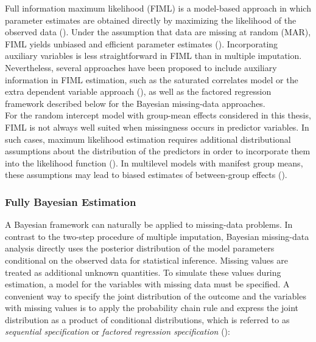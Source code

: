 \documentclass[
  letterpaper,
  11pt,
  english,
  singlespacing,
  headsepline,
  openany]{MastersDoctoralThesis}
\begin{document}
Full information maximum likelihood (FIML) is a model-based approach in
which parameter estimates are obtained directly by maximizing the
likelihood of the observed data (). Under the assumption that data are missing at random (MAR),
FIML yields unbiased and efficient parameter estimates
(). Incorporating auxiliary
variables is less straightforward in FIML than in multiple imputation.
Nevertheless, several approaches have been proposed to include auxiliary
information in FIML estimation, such as the saturated correlates model
or the extra dependent variable approach
(), as well as the factored
regression framework described below for the Bayesian missing-data
approaches.\\
For the random intercept model with group-mean effects considered in
this thesis, FIML is not always well suited when missingness occurs in
predictor variables. In such cases, maximum likelihood estimation
requires additional distributional assumptions about the distribution of
the predictors in order to incorporate them into the likelihood function
(). In multilevel models
with manifest group means, these assumptions may lead to biased
estimates of between-group effects ().

\subsubsection{Fully Bayesian
Estimation}\label{fully-bayesian-estimation}

A Bayesian framework can naturally be applied to missing-data problems.
In contrast to the two-step procedure of multiple imputation, Bayesian
missing-data analysis directly uses the posterior distribution of the
model parameters conditional on the observed data for statistical
inference. Missing values are treated as additional unknown quantities.
To simulate these values during estimation, a model for the variables
with missing data must be specified. A convenient way to specify the
joint distribution of the outcome and the variables with missing values
is to apply the probability chain rule and express the joint
distribution as a product of conditional distributions, which is
referred to as \emph{sequential specification} or \emph{factored
regression specification} ():
\end{document}

